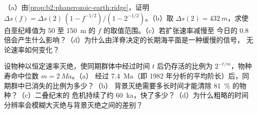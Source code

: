 \begin{exercise}[$\star\star\star$]\label{exo:b2:phanerozoic-earth:11}
（a）由\cref{prop:b2:phanerozoic-earth:ridge}，证明 $\Delta s(f) = \Delta s(2)\,(1 -
f^{-1/2})/(1 - 2^{-1/2})$。（b）取 $\Delta s(2) = \qty{432}{m}$，求使
白垩纪峰值为 50 至 \qty{150}{m} 的 $f$ 的取值范围。（c）若扩张速率减慢至
今日的 0.8 倍会产生什么影响？（d）为什么由洋脊决定的长期海平面是一种缓慢的信号，
无论速率如何变化？
\end{exercise}

\begin{exercise}[$\star\star\star$]\label{exo:b2:phanerozoic-earth:12}
设物种以恒定速率灭绝，使同期群体中经过时间
$t$ 后仍存活的比例为 $2^{-t/m}$，物种寿命中位数 $m = \qty{2}{Ma}$。（a）
经过 \qty{7.4}{Ma}（即 1982 年分析的平均阶长）后，同期群中已消失的比例为多少？（b）
背景灭绝需要多长时间才能清除 \qty{81}{\percent} 的物种？（c）二叠纪末的
危机持续了约 \qty{60}{ka}，快了多少？（d）为什么粗略的时间
分辨率会模糊大灭绝与背景灭绝之间的差别？
\end{exercise}

